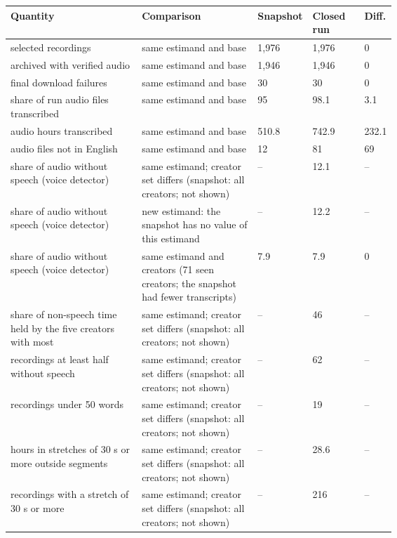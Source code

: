 {\scriptsize\setlength{\tabcolsep}{2pt}
\begin{tabular}{@{}p{0.34\linewidth}p{0.3\linewidth}lll@{}}
\toprule
Quantity & Comparison & Snapshot & Closed run & Diff. \\
\midrule
selected recordings & same estimand and base & 1{,}976 & 1{,}976 & 0 \\
archived with verified audio & same estimand and base & 1{,}946 & 1{,}946 & 0 \\
final download failures & same estimand and base & 30 & 30 & 0 \\
share of run audio files transcribed & same estimand and base & 95 & 98.1 & 3.1 \\
audio hours transcribed & same estimand and base & 510.8 & 742.9 & 232.1 \\
audio files not in English & same estimand and base & 12 & 81 & 69 \\
share of audio without speech (voice detector) & same estimand; creator set differs (snapshot: all creators; not shown) & -- & 12.1 & -- \\
share of audio without speech (voice detector) & new estimand: the snapshot has no value of this estimand & -- & 12.2 & -- \\
share of audio without speech (voice detector) & same estimand and creators (71 seen creators; the snapshot had fewer transcripts) & 7.9 & 7.9 & 0 \\
share of non-speech time held by the five creators with most & same estimand; creator set differs (snapshot: all creators; not shown) & -- & 46 & -- \\
recordings at least half without speech & same estimand; creator set differs (snapshot: all creators; not shown) & -- & 62 & -- \\
recordings under 50 words & same estimand; creator set differs (snapshot: all creators; not shown) & -- & 19 & -- \\
hours in stretches of 30 s or more outside segments & same estimand; creator set differs (snapshot: all creators; not shown) & -- & 28.6 & -- \\
recordings with a stretch of 30 s or more & same estimand; creator set differs (snapshot: all creators; not shown) & -- & 216 & -- \\

\end{tabular}}
